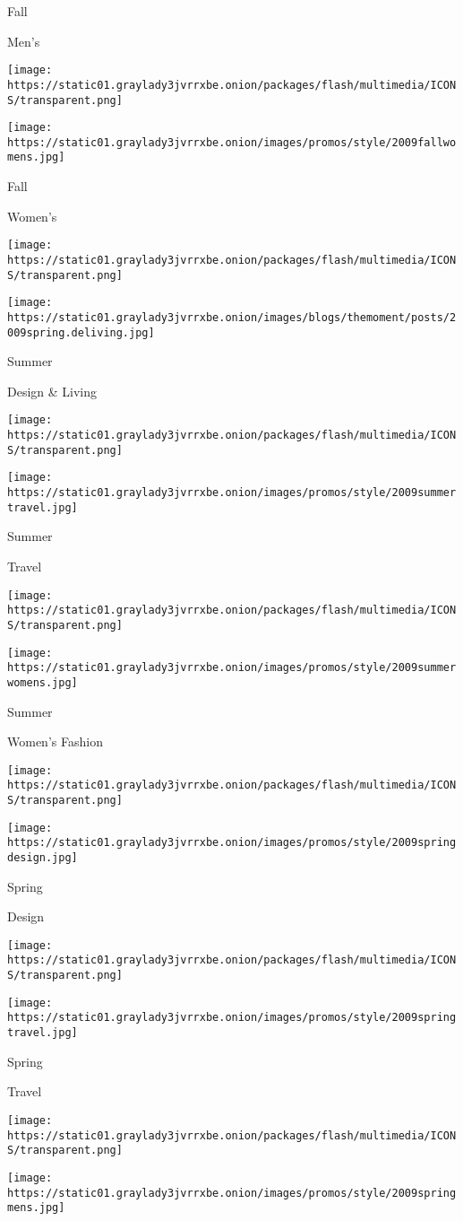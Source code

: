 Fall

Men's

\texttt{[image: https://static01.graylady3jvrrxbe.onion/packages/flash/multimedia/ICONS/transparent.png]}

\texttt{[image: https://static01.graylady3jvrrxbe.onion/images/promos/style/2009fallwomens.jpg]}

Fall

Women's

\texttt{[image: https://static01.graylady3jvrrxbe.onion/packages/flash/multimedia/ICONS/transparent.png]}

\texttt{[image: https://static01.graylady3jvrrxbe.onion/images/blogs/themoment/posts/2009spring.deliving.jpg]}

Summer

Design \& Living

\texttt{[image: https://static01.graylady3jvrrxbe.onion/packages/flash/multimedia/ICONS/transparent.png]}

\texttt{[image: https://static01.graylady3jvrrxbe.onion/images/promos/style/2009summertravel.jpg]}

Summer

Travel

\texttt{[image: https://static01.graylady3jvrrxbe.onion/packages/flash/multimedia/ICONS/transparent.png]}

\texttt{[image: https://static01.graylady3jvrrxbe.onion/images/promos/style/2009summerwomens.jpg]}

Summer

Women's Fashion

\texttt{[image: https://static01.graylady3jvrrxbe.onion/packages/flash/multimedia/ICONS/transparent.png]}

\texttt{[image: https://static01.graylady3jvrrxbe.onion/images/promos/style/2009springdesign.jpg]}

Spring

Design

\texttt{[image: https://static01.graylady3jvrrxbe.onion/packages/flash/multimedia/ICONS/transparent.png]}

\texttt{[image: https://static01.graylady3jvrrxbe.onion/images/promos/style/2009springtravel.jpg]}

Spring

Travel

\texttt{[image: https://static01.graylady3jvrrxbe.onion/packages/flash/multimedia/ICONS/transparent.png]}

\texttt{[image: https://static01.graylady3jvrrxbe.onion/images/promos/style/2009springmens.jpg]}

